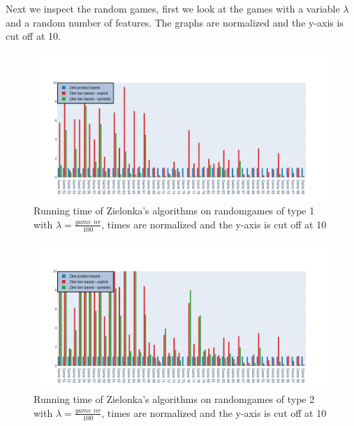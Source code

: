 Next we inspect the random games, first we look at the games with a variable $\lambda$ and a random number of features. The graphs are normalized and the y-axis is cut off at 10.
\begin{figure}[H]
\includegraphics[width=1\linewidth]{"results/FF_randomgames/Zlnk product based_Zlnk fam based - explicit_Zlnk fam based - symbolic_"}
\caption{Running time of Zielonka's algorithms on randomgames of type 1 with $\lambda = \frac{\textit{game nr}}{100}$, times are normalized and the y-axis is cut off at 10}
\label{fig:elevatorzlnks}
\end{figure}%
\begin{figure}[H]
\includegraphics[width=1\linewidth]{"results/FC_randomgames/Zlnk product based_Zlnk fam based - explicit_Zlnk fam based - symbolic_"}
\caption{Running time of Zielonka's algorithms on randomgames of type 2 with $\lambda = \frac{\textit{game nr}}{100}$, times are normalized and the y-axis is cut off at 10}
\label{fig:elevatorzlnks}
\end{figure}%
